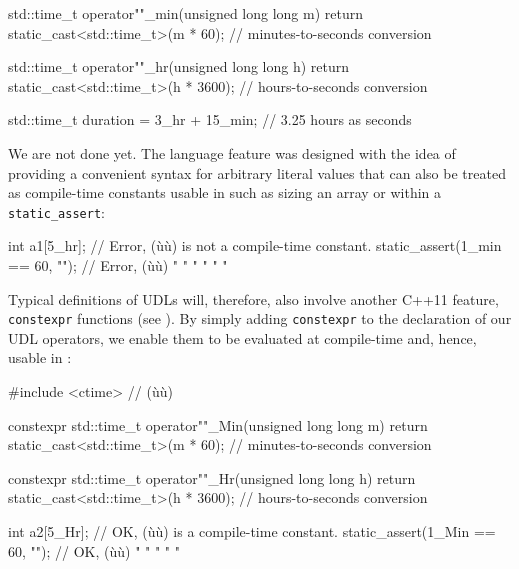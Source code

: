 \begin{emcppslisting}[emcppsbatch=e5]
std::time_t operator""_min(unsigned long long m)
{
    return static_cast<std::time_t>(m * 60);  // minutes-to-seconds conversion
}

std::time_t operator""_hr(unsigned long long h)
{
    return static_cast<std::time_t>(h * 3600);  // hours-to-seconds conversion
}

std::time_t duration = 3_hr + 15_min;  // 3.25 hours as seconds
\end{emcppslisting}
    
\noindent We are not done yet. The  language feature was designed with
the idea of providing a convenient syntax for arbitrary literal values
that can also be treated as compile-time constants usable in
 such as sizing an array or within a
\lstinline!static_assert!:

\begin{emcppslisting}
int a1[5_hr];                    // Error, (ù{}ù) is not a compile-time constant.
static_assert(1_min == 60, "");  // Error, (ù{}ù) "  "  "    "      "     "
\end{emcppslisting}
    
\noindent Typical definitions of UDLs will, therefore, also involve another C++11
feature, \lstinline!constexpr! functions (see ). By simply adding
\lstinline!constexpr! to the declaration of our UDL operators, we enable
them to be evaluated at compile-time and, hence, usable in
:

\begin{emcppshiddenlisting}[emcppsbatch=e6]
#include <ctime>  // (ù{}ù)
\end{emcppshiddenlisting}
\begin{emcppslisting}[emcppsbatch=e6]
constexpr std::time_t operator""_Min(unsigned long long m)
{
    return static_cast<std::time_t>(m * 60);  // minutes-to-seconds conversion
}

constexpr std::time_t operator""_Hr(unsigned long long h)
{
    return static_cast<std::time_t>(h * 3600);  // hours-to-seconds conversion
}

int a2[5_Hr];                    // OK, (ù{}ù) is a compile-time constant.
static_assert(1_Min == 60, "");  // OK, (ù{}ù) " "    "     "      "
\end{emcppslisting}
    
